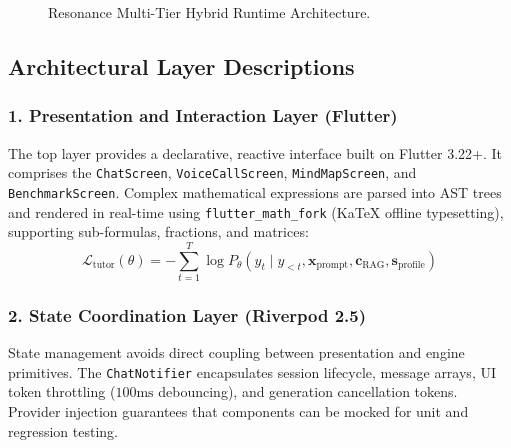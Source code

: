 \documentclass[10.5pt,a4paper]{article}
\begin{document}
\begin{figure}[h!]
{
}
\vspace{-0.2cm}
\caption{Resonance Multi-Tier Hybrid Runtime Architecture.}
\label{fig:architecture}
\end{figure}

\vspace{-0.2cm}

\subsection{Architectural Layer Descriptions}

\subsubsection{1. Presentation and Interaction Layer (Flutter)}
The top layer provides a declarative, reactive interface built on Flutter 3.22+. It comprises the \texttt{ChatScreen}, \texttt{VoiceCallScreen}, \texttt{MindMapScreen}, and \texttt{BenchmarkScreen}. Complex mathematical expressions are parsed into AST trees and rendered in real-time using \texttt{flutter\_math\_fork} (KaTeX offline typesetting), supporting sub-formulas, fractions, and matrices:
\begin{equation}
  \mathcal{L}_{\text{tutor}}(\theta) = -\sum_{t=1}^{T} \log P_\theta(y_t \mid y_{<t}, \mathbf{x}_{\text{prompt}}, \mathbf{c}_{\text{RAG}}, \mathbf{s}_{\text{profile}})
\end{equation}

\subsubsection{2. State Coordination Layer (Riverpod 2.5)}
State management avoids direct coupling between presentation and engine primitives. The \texttt{ChatNotifier} encapsulates session lifecycle, message arrays, UI token throttling ($100\text{ms}$ debouncing), and generation cancellation tokens. Provider injection guarantees that components can be mocked for unit and regression testing.
\end{document}
